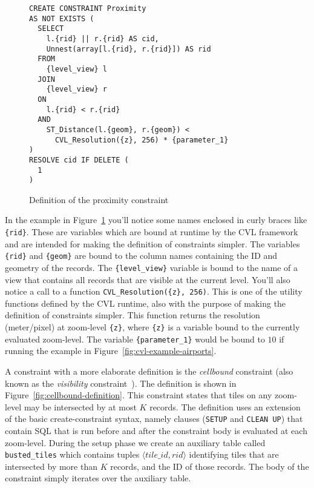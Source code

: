 \begin{figure}[htbp]
\begin{center}
\begin{lstlisting}
CREATE CONSTRAINT Proximity
AS NOT EXISTS (
  SELECT 
    l.{rid} || r.{rid} AS cid,
    Unnest(array[l.{rid}, r.{rid}]) AS rid
  FROM
    {level_view} l
  JOIN
    {level_view} r
  ON
    l.{rid} < r.{rid}
  AND
    ST_Distance(l.{geom}, r.{geom}) <
      CVL_Resolution({z}, 256) * {parameter_1}
)
RESOLVE cid IF DELETE (
  1
)
\end{lstlisting}
\caption{Definition of the proximity constraint}
\label{fig:proximity-definition}
\end{center}
\end{figure}

In the example in Figure~\ref{fig:proximity-definition} you'll notice some names enclosed in curly braces like \texttt{\{rid\}}. These are variables which are bound at runtime by the CVL framework and are intended for making the definition of constraints simpler. The variables \texttt{\{rid\}} and \texttt{\{geom\}} are bound to the column names containing the ID and geometry of the records. The \texttt{\{level\_view\}} variable is bound to the name of a view that contains all records that are visible at the current level. You'll also notice a call to a function \texttt{CVL\_Resolution(\{z\}, 256)}. This is one of the utility functions defined by the CVL runtime, also with the purpose of making the definition of constraints simpler. This function returns the resolution (meter/pixel) at zoom-level \texttt{\{z\}}, where \texttt{\{z\}} is a variable bound to the currently evaluated zoom-level. The variable \texttt{\{parameter\_1\}} would be bound to $10$ if running the example in Figure~\ref{fig:cvl-example-airports}.

A constraint with a more elaborate definition is the \emph{cellbound} constraint (also known as the \emph{visibility} constraint~\cite{sarma2012fusiontables}). The definition is shown in Figure~\ref{fig:cellbound-definition}. This constraint states that tiles on any zoom-level may be intersected by at most $K$ records. The definition uses an extension of the basic create-constraint syntax, namely clauses (\texttt{SETUP} and \texttt{CLEAN UP}) that contain SQL that is run before and after the constraint body is evaluated at each zoom-level. During the setup phase we create an auxiliary table called \texttt{busted\_tiles} which contains tuples $\langle tile\_id, rid \rangle$ identifying tiles that are intersected by more than $K$ records, and the ID of those records. The body of the constraint simply iterates over the auxiliary table.

